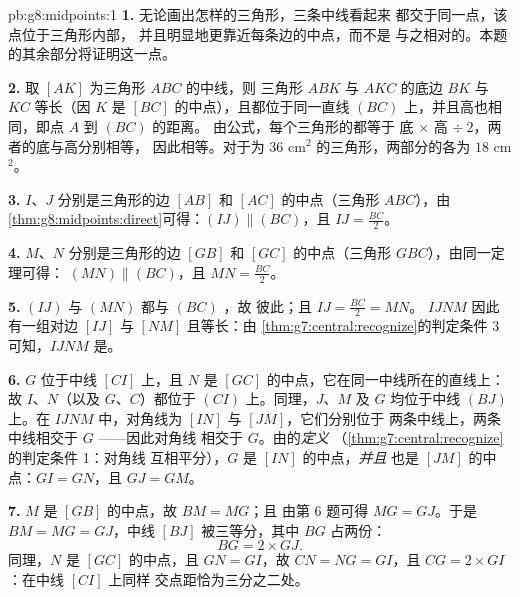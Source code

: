 \begin{solution}{pb:g8:midpoints:1}
\textbf{1.} 无论画出怎样的三角形，三条中线看起来
都交于同一点，该点位于三角形内部，
并且明显地更靠近每条边的中点，而不是
与之相对的。本题的其余部分将证明这一点。

\textbf{2.} 取 $[AK]$ 为三角形 $ABC$ 的中线，则
三角形 $ABK$ 与 $AKC$ 的底边 $BK$ 与 $KC$
等长（因 $K$ 是 $[BC]$ 的中点），且都位于同一直线
$(BC)$ 上，并且高也相同，即点 $A$ 到 $(BC)$ 的距离。
由公式，每个三角形的都等于
底 $\times$ 高 $\div\ 2$，两者的底与高分别相等，
因此相等。对于为
$36$ cm$^2$ 的三角形，两部分的各为 $18$ cm$^2$。

\textbf{3.} $I$、$J$ 分别是三角形的边 $[AB]$ 和
$[AC]$ 的中点（三角形 $ABC$），由
\cref{thm:g8:midpoints:direct}可得：$(IJ) \parallel (BC)$，且
$IJ = \frac{BC}{2}$。

\textbf{4.} $M$、$N$ 分别是三角形的边 $[GB]$ 和
$[GC]$ 的中点（三角形 $GBC$），由同一定理可得：
$(MN) \parallel (BC)$，且 $MN = \frac{BC}{2}$。

\textbf{5.} $(IJ)$ 与 $(MN)$ 都与 $(BC)$ ，故
彼此；且 $IJ = \frac{BC}{2} = MN$。
 $IJNM$ 因此有一组对边 $[IJ]$ 与
$[NM]$ 且等长：由
\cref{thm:g7:central:recognize}的判定条件 3 可知，$IJNM$ 是。

\textbf{6.} $G$ 位于中线 $[CI]$ 上，且 $N$ 是
$[GC]$ 的中点，它在同一中线所在的直线上：
故 $I$、$N$（以及 $G$、$C$）都位于 $(CI)$ 上。同理，$J$、$M$
及 $G$ 均位于中线 $(BJ)$ 上。在
$IJNM$ 中，对角线为 $[IN]$ 与 $[JM]$，它们分别位于
两条中线上，两条中线相交于 $G$ ——因此对角线
相交于 $G$。由的\emph{定义}
（\cref{thm:g7:central:recognize}的判定条件 1：对角线
互相平分），$G$ 是 $[IN]$ 的中点，\emph{并且}
也是 $[JM]$ 的中点：$GI = GN$，且 $GJ = GM$。

\textbf{7.} $M$ 是 $[GB]$ 的中点，故 $BM = MG$；且
由第 6 题可得 $MG = GJ$。于是 $BM = MG = GJ$，中线
$[BJ]$ 被三等分，其中 $BG$ 占两份：
\[
BG = 2 \times GJ .
\]
同理，$N$ 是 $[GC]$ 的中点，且 $GN = GI$，故
$CN = NG = GI$，且 $CG = 2 \times GI$：在中线 $[CI]$ 上同样
交点距恰为三分之二处。


\end{solution}
